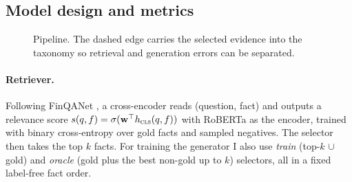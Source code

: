 \documentclass{article}
\begin{document}
\subsection{Model design and metrics}\label{sec:model}

\begin{figure}[h]
\centering
{}
\caption{Pipeline. The dashed edge carries the selected evidence into the taxonomy so retrieval and generation errors can be separated.}\label{fig:pipe}
\end{figure}

\paragraph{Retriever.} Following FinQANet \citep{chen2021finqa}, a cross-encoder reads (question, fact) and outputs a relevance score $s(q,f)=\sigma(\mathbf{w}^\top h_{\textsc{cls}}(q,f))$ with RoBERTa \citep{liu2019roberta} as the encoder, trained with binary cross-entropy over gold facts and sampled negatives. The selector then takes the top $k$ facts. For training the generator I also use \emph{train} (top-$k$ $\cup$ gold) and \emph{oracle} (gold plus the best non-gold up to $k$) selectors, all in a fixed label-free fact order.
\end{document}
